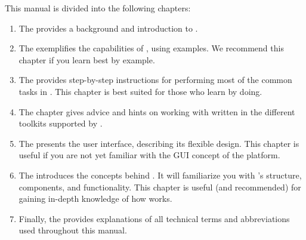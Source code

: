 This manual is divided into the following chapters:

\begin{enumerate}
\item The  provides a background and introduction to \app{}.

\item The   exemplifies the capabilities of \app{}, using 
\app{} \gdproject{} examples.
We recommend this chapter if you learn best by example. 

\item The  provides step-by-step instructions for performing most of the common tasks in \app{}.
This chapter is best suited for those who learn by doing.

\item The  chapter  gives advice and hints on working with \gdauts{} written in the different toolkits supported by \app{}.

\item The  presents the \app{} user interface, describing its flexible design.
This chapter is useful if you are not yet familiar  with the GUI concept of the  platform.

\item The  introduces the concepts behind
  \app{}. It will familiarize you with \app{}'s structure, components, and functionality. This chapter is useful (and recommended) for gaining in-depth knowledge of how \app{} works.


\item Finally, the  provides explanations of all
technical terms and abbreviations used throughout this manual.
\end{enumerate}
